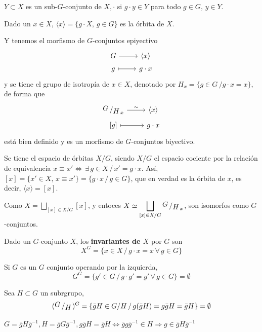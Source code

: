 \begin{defi}
    $Y\subset X$ es un sub-$G$-conjunto de $X, \cdot$  si $g\cdot y \in Y$ para todo $g\in G, \, y \in Y$.  

    Dado un $x\in X$, $\langle x \rangle = \{g\cdot X, \, g \in G\}$ es la \'orbita de $X$. 

    Y tenemos el morfismo de $G$-conjuntos epiyectivo
    $$\bt G \rar & \langle x \rangle \\[-5mm] g \rarmaps & g \cdot x \et$$
    y se tiene el grupo de isotrop\'ia de $x \in X$, denotado por $H_x = \{g\in G \, / g\cdot x=x \}$, de forma que 
    $$\bt \modulo{G}{H}_x \rar{\sim} & \langle x \rangle \\[-5mm] {[g]} \rarmaps & g\cdot x \et$$
    est\'a bien definido y es un morfismo de $G$-conjuntos biyectivo. 
\end{defi}
\begin{defi}
    Se tiene el espacio de \'orbitas $X/G$, siendo $X/G$ el espacio cociente por la relaci\'on de equivalencia $x \equiv x' \iff \, \exists \, g\in X \, / \, x'=g\cdot x$.
    As\'i, $[x] = \{x' \in X, \, x\equiv x'\} = \{g\cdot x \,/\, g\in G\}$, que en verdad es la \'orbita de $x$, es decir, $\langle x\rangle = [x]$.
\end{defi}
\begin{prop}
Como $\displaystyle X = \bigsqcup_{[x] \in X/G} [x]$, y entoces $\displaystyle X \simeq \bigsqcup_{[x] \in X/G} \modulo{G}{H}_x$, son isomorfos como $G$-conjuntos. 
\end{prop}
\begin{defi}
    Dado un $G$-conjunto $X$, los \textbf{invariantes de $X$} por $G$ son $$X^G = \{x\in X\, / \, g\cdot x = x \, \forall \, g\in G\}$$
\end{defi}
\begin{ejem}
    Si $G$ es un $G$ conjunto operando por la izquierda, 
    $$G^G = \{g'\in G\,/\, g\cdot g'=g' \, \forall \, g\in G \} = \emptyset$$
\end{ejem}
\begin{prop}
Sea $H \subset G$ un subrgrupo, 
$$(\modulo{G}{H})^G = \{\bar g H \in G /H \, / \, g (\bar g H)  = g \bar g H= \bar g H \} = \emptyset $$ 
\end{prop}
\begin{dem}
$G = \bar g H \bar g^{-1}, H = \bar g G \bar g^{-1}, g\bar g H = \bar g H \iff \bar g g \bar g^{-1} \in H \Rightarrow g \in \bar g H \bar g^{-1}$
\end{dem}

